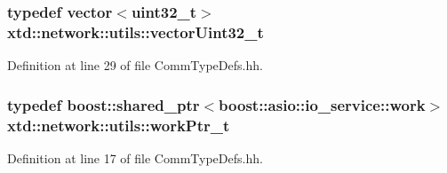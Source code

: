 \hypertarget{namespacextd_1_1network_1_1utils_a2b135df55039cd8024b40ef3e1817681}{
\subsubsection[{vector\-Uint32\-\_\-t}]{\setlength{\rightskip}{0pt plus 5cm}typedef vector$<$uint32\-\_\-t$>$ {\bf xtd\-::network\-::utils\-::vector\-Uint32\-\_\-t}}}\label{namespacextd_1_1network_1_1utils_a2b135df55039cd8024b40ef3e1817681}


Definition at line 29 of file Comm\-Type\-Defs.\-hh.

\hypertarget{namespacextd_1_1network_1_1utils_a9e0bae7b0da2b42ca8930a927f3a7c4d}{
\subsubsection[{work\-Ptr\-\_\-t}]{\setlength{\rightskip}{0pt plus 5cm}typedef boost\-::shared\-\_\-ptr$<$boost\-::asio\-::io\-\_\-service\-::work$>$ {\bf xtd\-::network\-::utils\-::work\-Ptr\-\_\-t}}}\label{namespacextd_1_1network_1_1utils_a9e0bae7b0da2b42ca8930a927f3a7c4d}


Definition at line 17 of file Comm\-Type\-Defs.\-hh.



